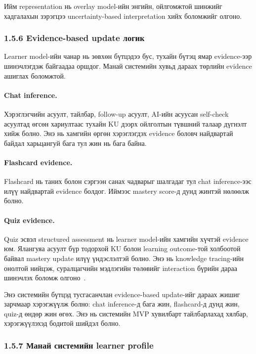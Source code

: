 \documentclass[12pt,A4]{report}
\begin{document}
Ийм representation нь overlay model-ийн энгийн, ойлгомжтой шинжийг хадгалахын зэрэгцээ uncertainty-based interpretation хийх боломжийг олгоно.

\subsubsection{1.5.6 Evidence-based update логик}

Learner model-ийн чанар нь зөвхөн бүтцэдээ бус, тухайн бүтэц ямар evidence-ээр шинэчлэгдэж байгаадаа оршдог. Манай системийн хувьд дараах төрлийн evidence ашиглах боломжтой.

\paragraph{Chat inference.}
Хэрэглэгчийн асуулт, тайлбар, follow-up асуулт, AI-ийн асуусан self-check асуултад өгсөн хариултаас тухайн KU дээрх ойлголтын түвшний талаар дүгнэлт хийж болно. Энэ нь хамгийн өргөн хэрэглэгдэх evidence боловч найдвартай байдал харьцангуй бага тул жин нь бага байна.

\paragraph{Flashcard evidence.}
Flashcard нь таних болон сэргээн санах чадварыг шалгадаг тул chat inference-ээс илүү найдвартай evidence болдог. Иймээс mastery score-д дунд жинтэй нөлөөлж болно.

\paragraph{Quiz evidence.}
Quiz эсвэл structured assessment нь learner model-ийн хамгийн хүчтэй evidence юм. Ялангуяа асуулт бүр тодорхой KU болон learning outcome-той холбоотой байвал mastery update илүү үндэслэлтэй болно. Энэ нь knowledge tracing-ийн онолтой нийцэж, суралцагчийн мэдлэгийн төлөвийг interaction бүрийн дараа шинэчлэх боломж олгоно~\cite{corbett1994}.

Энэ системийн бүтцэд тусгасанчлан evidence-based update-ийг дараах жишиг зарчмаар хэрэгжүүлж болно: chat inference-д бага жин, flashcard-д дунд жин, quiz-д өндөр жин өгөх. Энэ нь системийн MVP хувилбарт тайлбарлахад хялбар, хэрэгжүүлэхэд бодитой шийдэл болно.

\subsubsection{1.5.7 Манай системийн learner profile}
\end{document}

